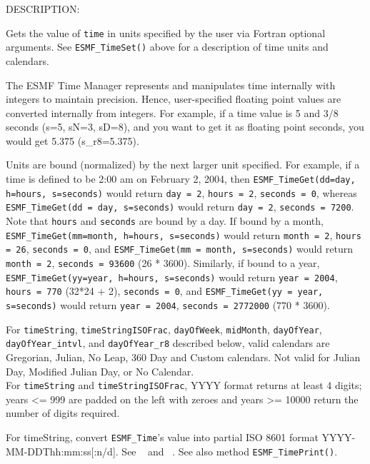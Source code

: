 {\sf DESCRIPTION:\\ }


       Gets the value of {\tt time} in units specified by the user
       via Fortran optional arguments.  See {\tt ESMF\_TimeSet()} above for a
       description of time units and calendars.
  
       The ESMF Time Manager represents and manipulates time internally with 
       integers to maintain precision.  Hence, user-specified floating point 
       values are converted internally from integers.  For example, if a time
       value is 5 and 3/8 seconds (s=5, sN=3, sD=8), and you want to get it as
       floating point seconds, you would get 5.375 (s\_r8=5.375).
  
       Units are bound (normalized) by the next larger unit specified.  For
       example, if a time is defined to be 2:00 am on February 2, 2004, then
       {\tt ESMF\_TimeGet(dd=day, h=hours, s=seconds)} would return
         {\tt day = 2}, {\tt hours = 2}, {\tt seconds = 0},
       whereas {\tt ESMF\_TimeGet(dd = day, s=seconds)} would return
         {\tt day = 2}, {\tt seconds = 7200}.
       Note that {\tt hours} and {\tt seconds} are bound by a day.  If bound
       by a month,
       {\tt ESMF\_TimeGet(mm=month, h=hours, s=seconds)} would return
         {\tt month = 2}, {\tt hours = 26}, {\tt seconds = 0},
       and {\tt ESMF\_TimeGet(mm = month, s=seconds)} would return
         {\tt month = 2}, {\tt seconds = 93600} (26 * 3600).
       Similarly, if bound to a year,
       {\tt ESMF\_TimeGet(yy=year, h=hours, s=seconds)} would return
         {\tt year = 2004}, {\tt hours = 770} (32*24 + 2), {\tt seconds = 0},
       and {\tt ESMF\_TimeGet(yy = year, s=seconds)} would return
         {\tt year = 2004}, {\tt seconds = 2772000} (770 * 3600).
  
       For {\tt timeString}, {\tt timeStringISOFrac}, {\tt dayOfWeek},
       {\tt midMonth}, {\tt dayOfYear}, {\tt dayOfYear\_intvl}, and
       {\tt dayOfYear\_r8} described below, valid calendars are Gregorian,
       Julian, No Leap, 360 Day and Custom calendars.  Not valid for
       Julian Day, Modified Julian Day, or No Calendar. \\
  
       For {\tt timeString} and {\tt timeStringISOFrac}, YYYY format returns
       at least 4 digits; years <= 999 are padded on the left with zeroes and
       years >= 10000 return the number of digits required.
  
       For timeString, convert {\tt ESMF\_Time}'s value into partial ISO 8601
       format YYYY-MM-DDThh:mm:ss[:n/d].  See ~\cite{ISO} and ~\cite{ISOnotes}.
       See also method {\tt ESMF\_TimePrint()}.
       
